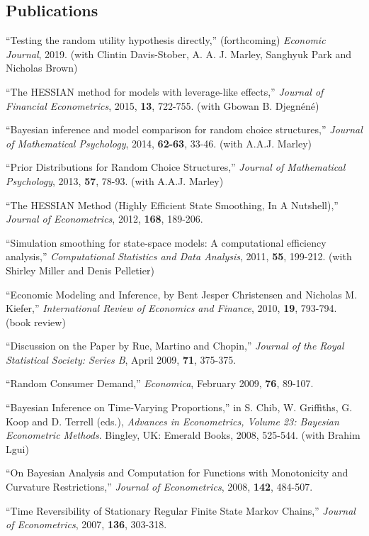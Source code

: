 \documentclass[12pt]{article}
\begin{document}
\subsection*{Publications}

``Testing the random utility hypothesis directly,'' (forthcoming)
{\it Economic Journal}, 2019.
(with Clintin Davis-Stober, A. A. J. Marley, Sanghyuk Park and Nicholas Brown)

``The HESSIAN method for models with leverage-like effects,''
{\it Journal of Financial Econometrics}, 2015,
{\bf 13}, 722-755.
(with Gbowan B. Djegn\'en\'e)

``Bayesian inference and model comparison for random choice structures,''
{\it Journal of Mathematical Psychology}, 2014,
{\bf 62-63}, 33-46.
(with A.A.J. Marley)

``Prior Distributions for Random Choice Structures,''
{\it Journal of Mathematical Psychology}, 2013,
{\bf 57}, 78-93.
(with A.A.J. Marley)

``The HESSIAN Method (Highly Efficient State Smoothing, In A Nutshell),''
{\it Journal of Econometrics}, 2012,
{\bf 168}, 189-206.

``Simulation smoothing for state-space models: A computational efficiency analysis,''
{\it Computational Statistics and Data Analysis}, 2011,
{\bf 55}, 199-212.
(with Shirley Miller and Denis Pelletier)

``Economic Modeling and Inference, by Bent Jesper Christensen and Nicholas M. Kiefer,''
{\it International Review of Economics and Finance}, 2010,
{\bf 19}, 793-794.
(book review)

``Discussion on the Paper by Rue, Martino and Chopin,''
{\it Journal of the Royal Statistical Society: Series B}, April 2009,
{\bf 71}, 375-375.

``Random Consumer Demand,'' {\it Economica}, February 2009,
{\bf 76}, 89-107.
 
``Bayesian Inference on Time-Varying Proportions,'' in S. Chib, W. Griffiths, G. Koop and D. Terrell (eds.),
{\it Advances in Econometrics, Volume 23: Bayesian Econometric Methods}.
Bingley, UK: Emerald Books, 2008, 525-544.
(with Brahim Lgui)

``On Bayesian Analysis and Computation for Functions with Monotonicity and Curvature Restrictions,''  {\it Journal of Econometrics}, 2008,
{\bf 142}, 484-507.

``Time Reversibility of Stationary Regular Finite State Markov Chains,''  {\it Journal of Econometrics},
2007,
{\bf 136}, 303-318.
\end{document}
